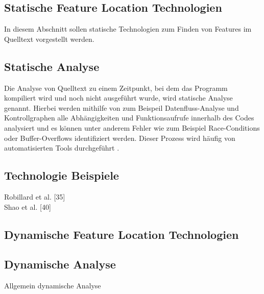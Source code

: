 \documentclass[runningheads,a4paper]{llncs}
\begin{document}



\subsection{Statische Feature Location Technologien}

In diesem Abschnitt sollen statische Technologien zum Finden von Features im Quelltext vorgestellt werden.

\subsection*{Statische Analyse}

Die Analyse von Quelltext zu einem Zeitpunkt, bei dem das Programm kompiliert wird und noch nicht ausgeführt wurde, wird statische Analyse genannt. Hierbei werden mithilfe von zum Beispeil Datenfluss-Analyse und Kontrollgraphen alle Abhängigkeiten und Funktionsaufrufe innerhalb des Codes analysiert und es können unter anderem Fehler wie zum Beispiel Race-Conditions oder Buffer-Overflows identifiziert werden. Dieser Prozess wird häufig von automatisierten Tools durchgeführt \cite{static}.

\subsection*{Technologie Beispiele}

Robillard et al. [35]\\
Shao et al. [40]

\subsection{Dynamische Feature Location Technologien}

\subsection*{Dynamische Analyse}
Allgemein dynamische Analyse
\end{document}
